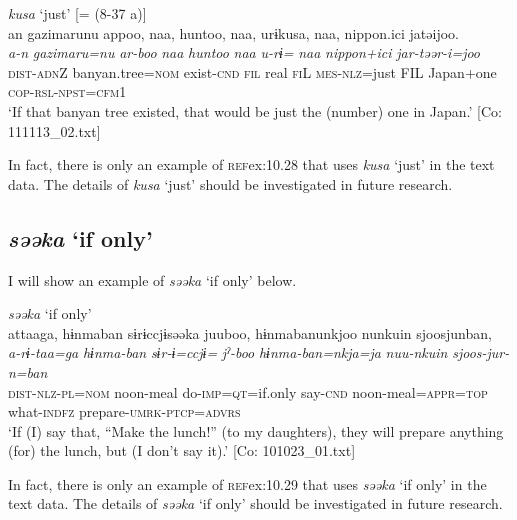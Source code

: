 \ea\label{ex:10.28}   \textit{kusa} ‘just’ [= (8-37 a)]\\
      \glll    an  gazimarunu  appoo,  naa,  huntoo,  naa,   urɨkusa,  naa,  {\textbar}nippon.ici{\textbar}  jatəijoo.\\
    \textit{a-n}  \textit{gazimaru=nu}  \textit{ar-boo}  \textit{naa}  \textit{huntoo}  \textit{naa} \textit{u-rɨ=}  \textit{naa}  \textit{nippon+ici}  \textit{jar-təər-i=joo}\\
    \textsc{dist}-\textsc{adn}Z  banyan.tree=\textsc{nom}  exist-\textsc{cnd}  \textsc{fil}  real  \textsc{fi}L \textsc{mes}-\textsc{nlz}=just  FIL  Japan+one  \textsc{cop}-\textsc{rsl}-\textsc{npst}=\textsc{cfm}1\\
\glt     ‘If that banyan tree existed, that would be just the (number) one in Japan.’  [Co: 111113\_02.txt]
\z

In fact, there is only an example of \textsc{ref}{ex:10.28} that uses \textit{kusa} ‘just’ in the text data. The details of \textit{kusa} ‘just’ should be investigated in future research.

\subsection{\textit{səəka} ‘if only’}\label{sec:10.1.8}

I will show an example of \textit{səəka} ‘if only’ below.

\ea\label{ex:10.29}   \textit{səəka} ‘if only’\\
      \glll    attaaga,  hɨnmaban  sɨrɨccjɨsəəka  juuboo,  hɨnmabanunkjoo  nunkuin  sjoosjunban,\\
    \textit{a-rɨ-taa=ga}  \textit{hɨnma-ban}  \textit{sɨr-ɨ=ccjɨ=}  \textit{jˀ-boo}  \textit{hɨnma-ban=nkja=ja}  \textit{nuu-nkuin}  \textit{sjoos-jur-n=ban}\\
    \textsc{dist}-\textsc{nlz}-\textsc{pl}=\textsc{nom}  noon-meal  do-\textsc{imp}=\textsc{qt}=if.only  say-\textsc{cnd}   noon-meal=\textsc{appr}=\textsc{top}  what-\textsc{indfz}  prepare-\textsc{umrk}-\textsc{ptcp}=\textsc{advrs}\\
\glt     ‘If (I) say that, “Make the lunch!” (to my daughters), they will prepare anything (for) the lunch, but (I don’t say it).’  [Co: 101023\_01.txt]
\z

In fact, there is only an example of \textsc{ref}{ex:10.29} that uses \textit{səəka} ‘if only’ in the text data. The details of \textit{səəka} ‘if only’ should be investigated in future research.


